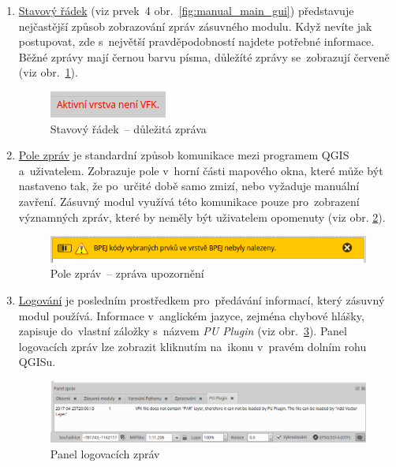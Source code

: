 \begin{enumerate}[leftmargin=1.5cm, noitemsep]
	\item \underline{Stavový řádek} (viz prvek~4 obr.~\ref{fig:manual_main_gui}) představuje nejčastější způsob zobrazování zpráv zásuvného modulu. Když nevíte jak postupovat, zde s~největší pravděpodobností najdete potřebné informace. Běžné zprávy mají černou barvu písma, důležíté zprávy se~zobrazují červeně (viz obr.~\ref{fig:manual_dulezita_zprava}).
	
	\begin{figure}[H]
		\centering
		\includegraphics[width=.23\textwidth]{./pictures/statusbar-red_message.png}
		\caption[Stavový řádek~– důležitá zpráva]{Stavový řádek~– důležitá zpráva}
		\label{fig:manual_dulezita_zprava}
 	\end{figure}	

	\item \underline{Pole zpráv} je standardní způsob komunikace mezi programem QGIS a~uživatelem. Zobrazuje pole v~horní části mapového okna, které může být nastaveno tak, že po~určité době samo zmizí, nebo vyžaduje manuální zavření. Zásuvný modul využívá této komunikace pouze pro~zobrazení významných zpráv, které by neměly být uživatelem opomenuty (viz obr. \ref{fig:manual_zprava_pole_zprav}).

	\begin{figure}[H]
		\centering
		\includegraphics[width=.7\textwidth]{./pictures/message_bar-message.png}
		\caption[Pole zpráv~– zpráva upozornění]{Pole zpráv~– zpráva upozornění}
		\label{fig:manual_zprava_pole_zprav}
 	\end{figure}

	\item \underline{Logování} je posledním prostředkem pro~předávání informací, který zásuvný modul používá. Informace v~anglickém jazyce, zejména chybové hlášky, zapisuje do~vlastní záložky s~názvem \textit{PU Plugin} (viz obr.~\ref{fig:manual_logovaci_panel}). Panel logovacích zpráv lze zobrazit kliknutím na~ikonu  v~pravém dolním rohu QGISu.

	\begin{figure}[H]
		\centering
		\includegraphics[width=1.0\textwidth]{./pictures/log_panel.png}
		\caption[Panel logovacích zpráv]{Panel logovacích zpráv}
		\label{fig:manual_logovaci_panel}
 	\end{figure}

\end{enumerate}

